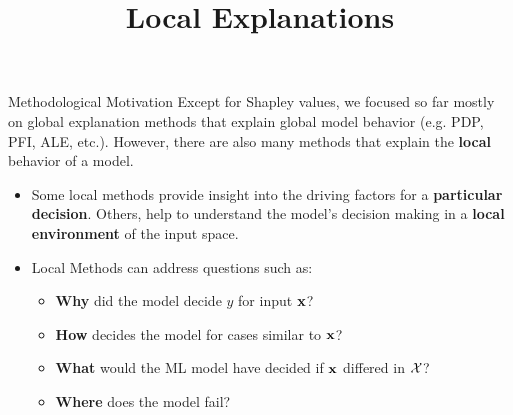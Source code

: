 \documentclass[11pt,compress,t,notes=noshow, xcolor=table]{beamer}
\title{Local Explanations}
\institute{\href{https://compstat-lmu.github.io/lecture_i2ml/}{compstat-lmu.github.io/lecture\_i2ml}}
\date{}
\begin{document}









\begin{vbframe}{Methodological Motivation}
Except for Shapley values, we focused so far mostly on global explanation methods that explain global model behavior (e.g. PDP, PFI, ALE, etc.). However, there are also many methods that explain the \textbf{local} behavior of a model.
	\begin{itemize}
		\item Some local methods provide insight into the driving factors for a \textbf{particular decision}. Others, help to understand the model's decision making in a \textbf{local environment} of the input space.
		\item Local Methods can address questions such as: 
		\begin{itemize}
		    \item \textbf{Why} did the model decide $y$ for input $\xv$?
		    \item \textbf{How} decides the model for cases similar to $\xv$?
		    \item \textbf{What} would the ML model have decided if $\xv$ differed in $\Xspace$?
		    \item  \textbf{Where} does the model fail?
		\end{itemize}  
	\end{itemize}
\end{vbframe}
\end{document}
